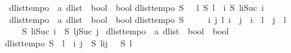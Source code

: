 \begin{isabellebody}
\isanewline
{}\isamarkupfalse%
\ dlist{\isacharunderscore}tempo{}\ {\isacharcolon}{\isacharcolon}\ {\isachardoublequoteopen}{\isacharparenleft}{\isacharprime}a\ dlist\ {\isasymRightarrow}\ bool{\isacharparenright}\ {\isasymRightarrow}\ bool{\isachardoublequoteclose}\isanewline
{}\isanewline
{\isachardoublequoteopen}dlist{\isacharunderscore}tempo{}\ S\ {\isasymequiv}\ {\isasymforall}\ l{\isachardot}\ S\ l\ {\isasymlongleftrightarrow}\ {\isacharparenleft}{\isasymexists}i{\isachardot}\ S\ {\isacharparenleft}l{\isasymdagger}i{\isachardot}{\isachardot}{\isacharparenleft}Suc\ i{\isacharparenright}{\isacharparenright}{\isacharparenright}{\isachardoublequoteclose}\isanewline
\isanewline
{}\isamarkupfalse%
\ dlist{\isacharunderscore}tempo{}\ {\isacharcolon}{\isacharcolon}\ {\isachardoublequoteopen}{\isacharparenleft}{\isacharprime}a\ dlist\ {\isasymRightarrow}\ bool{\isacharparenright}\ {\isasymRightarrow}\ bool{\isachardoublequoteclose}\isanewline
{}\isanewline
{\isachardoublequoteopen}dlist{\isacharunderscore}tempo{}\ S\ {\isasymequiv}\ \isanewline
\ \ {\isasymforall}\ i\ j\ l{\isachardot}\ {\isacharparenleft}i\ {\isasymnoteq}\ j\ {\isasymand}\ i\ {\isacharless}\ {\isacharparenleft}{\isacharhash}l{\isacharparenright}\ {\isasymand}\ j\ {\isacharless}\ {\isacharparenleft}{\isacharhash}l{\isacharparenright}{\isacharparenright}\ {\isasymlongrightarrow}\ \isanewline
\ \ \ \ {\isasymnot}{\isacharparenleft}S\ {\isacharparenleft}l{\isasymdagger}i{\isachardot}{\isachardot}{\isacharparenleft}Suc\ i{\isacharparenright}{\isacharparenright}\ {\isasymand}\ S\ {\isacharparenleft}l{\isasymdagger}j{\isachardot}{\isachardot}{\isacharparenleft}Suc\ j{\isacharparenright}{\isacharparenright}{\isacharparenright}{\isachardoublequoteclose}\isanewline
\isanewline
{}\isamarkupfalse%
\ dlist{\isacharunderscore}tempo{}\ {\isacharcolon}{\isacharcolon}\ {\isachardoublequoteopen}{\isacharparenleft}{\isacharprime}a\ dlist\ {\isasymRightarrow}\ bool{\isacharparenright}\ {\isasymRightarrow}\ bool{\isachardoublequoteclose}\isanewline
{}\isanewline
{\isachardoublequoteopen}dlist{\isacharunderscore}tempo{}\ S\ {\isasymequiv}\ {\isasymforall}l{\isachardot}\ {\isacharparenleft}{\isasymforall}\ i\ j{\isachardot}\ {\isasymnot}\ S\ {\isacharparenleft}l{\isasymdagger}i{\isachardot}{\isachardot}j{\isacharparenright}{\isacharparenright}\ {\isasymlongleftrightarrow}\ {\isasymnot}\ S\ l{\isachardoublequoteclose}\isanewline
\isanewline

\end{isabellebody}
